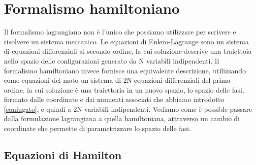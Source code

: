\section{Formalismo hamiltoniano}

    Il formalismo lagrangiano non è l'unico che possiamo utilizzare per scrivere e risolvere un sistema meccanico. Le equazioni di Eulero-Lagrange sono un sistema di equazioni differenziali al secondo ordine, la cui soluzione descrive una traiettoia nello spazio delle configurazioni generato da N variabili indipendenti. Il formalismo hamiltoniano invece fornisce una equivalente descrizione, utilizzando come equazioni del moto un sistema di 2N equazioni differenziali del primo ordine, la cui soluzione è una traiettoria in un nuovo spazio, lo spazio delle fasi, formato dalle coordinate e dai momenti associati che abbiamo introdotto \eqref{coniugato}, e quindi a 2N variabili indipendenti. Vediamo come è possible passare dalla formulazione lagrangiana a quella hamiltoniana, attraverso un cambio di coordinate che permette di parametrizzare lo spazio delle fasi. 
    
\subsection{Equazioni di Hamilton}

